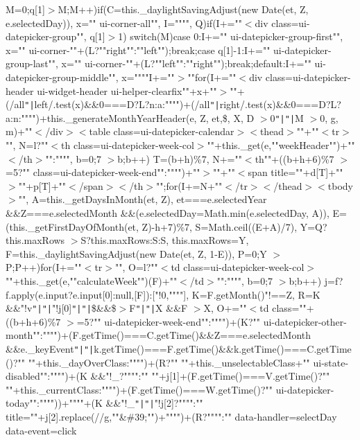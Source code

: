 M=0;q[1]$>$\+M;\+M++)\lcurly{}if(\+C=this.\+\_\+daylight\+Saving\+Adjust(new Date(et, Z, e.\+selected\+Day)), x="" ui-\/corner-\/all"", I="""", Q)\lcurly{}if(\+I+=""$<$div class=\textquotesingle{}ui-\/datepicker-\/group"", q[1]$>$1) switch(\+M)\lcurly{}case 0\+:\+I+="" ui-\/datepicker-\/group-\/first"", x="" ui-\/corner-\/""+(\+L?""right""\+:""left"");break;case q[1]-\/1\+:\+I+="" ui-\/datepicker-\/group-\/last"", x="" ui-\/corner-\/""+(\+L?""left""\+:""right"");break;default\+:\+I+="" ui-\/datepicker-\/group-\/middle"", x=""""\rcurly{}I+=""\textquotesingle{}$>$""\rcurly{}for(\+I+=""$<$div class=\textquotesingle{}ui-\/datepicker-\/header ui-\/widget-\/header ui-\/helper-\/clearfix""+x+""\textquotesingle{}$>$""+(/all\texttt{"|}left/.\+test(x)\&\&0===\+D?\+L?n\+:a\+:"""")+(/all\texttt{"|}right/.\+test(x)\&\&0===\+D?\+L?a\+:n\+:"""")+this.\+\_\+generate\+Month\+Year\+Header(e, Z, et,\$, X, D $>$0\texttt{"|}\texttt{"|}M $>$0, g, m)+""$<$/div$>$$<$table class=\textquotesingle{}ui-\/datepicker-\/calendar\textquotesingle{}$>$$<$thead$>$""+""$<$tr$>$"", N=l?""$<$th class=\textquotesingle{}ui-\/datepicker-\/week-\/col\textquotesingle{}$>$""+this.\+\_\+get(e,""week\+Header"")+""$<$/th$>$""\+:"""", b=0;7 $>$b;b++) T=(b+h)\%7, N+=""$<$th""+((b+h+6)\%7 $>$=5?"" class=\textquotesingle{}ui-\/datepicker-\/week-\/end\textquotesingle{}""\+:"""")+""$>$""+""$<$span title=\textquotesingle{}""+d[T]+""\textquotesingle{}$>$""+p[T]+""$<$/span$>$$<$/th$>$"";for(\+I+=\+N+""$<$/tr$>$$<$/thead$>$$<$tbody$>$"", A=this.\+\_\+get\+Days\+In\+Month(et, Z), et===e.\+selected\+Year \&\&\+Z===e.\+selected\+Month \&\&(e.\+selected\+Day=\+Math.\+min(e.\+selected\+Day, A)), E=(this.\+\_\+get\+First\+Day\+Of\+Month(et, Z)-\/h+7)\%7, S=\+Math.\+ceil((\+E+\+A)/7), Y=\+Q?this.\+max\+Rows $>$\+S?this.\+max\+Rows\+:\+S\+:\+S, this.\+max\+Rows=\+Y, F=this.\+\_\+daylight\+Saving\+Adjust(new Date(et, Z, 1-\/\+E)), P=0;\+Y $>$\+P;\+P++)\lcurly{}for(\+I+=""$<$tr$>$"", O=l?""$<$td class=\textquotesingle{}ui-\/datepicker-\/week-\/col\textquotesingle{}$>$""+this.\+\_\+get(e,""calculate\+Week"")(\+F)+""$<$/td$>$""\+:"""", b=0;7 $>$b;b++) j=f?f.\+apply(e.\+input?e.\+input[0]\+:null,[F])\+:["!0,""""], K=\+F.\+get\+Month()"!==\+Z, R=\+K \&\&"!v\texttt{"|}\texttt{"|}"!j[0]\texttt{"|}\texttt{"|}\$\&\&\$$>$F\texttt{"|}\texttt{"|}X \&\&\+F $>$\+X, O+=""$<$td class=\textquotesingle{}""+((b+h+6)\%7 $>$=5?"" ui-\/datepicker-\/week-\/end""\+:"""")+(\+K?"" ui-\/datepicker-\/other-\/month""\+:"""")+(\+F.\+get\+Time()===\+C.\+get\+Time()\&\&\+Z===e.\+selected\+Month \&\&e.\+\_\+key\+Event\texttt{"|}\texttt{"|}k.\+get\+Time()===\+F.\+get\+Time()\&\&k.\+get\+Time()===\+C.\+get\+Time()?"" ""+this.\+\_\+day\+Over\+Class\+:"""")+(\+R?"" ""+this.\+\_\+unselectable\+Class+"" ui-\/state-\/disabled""\+:"""")+(\+K \&\&"!\+\_\+?""""\+:"" ""+j[1]+(\+F.\+get\+Time()===\+V.\+get\+Time()?"" ""+this.\+\_\+current\+Class\+:"""")+(\+F.\+get\+Time()===\+W.\+get\+Time()?"" ui-\/datepicker-\/today""\+:""""))+""\textquotesingle{}""+(\+K \&\&"!\+\_\+\texttt{"|}\texttt{"|}"!j[2]?""""\+:"" title=\textquotesingle{}""+j[2].\+replace(/\textquotesingle{}/g,""\&\#39;"")+""\textquotesingle{}"")+(\+R?""""\+:"" data-\/handler=\textquotesingle{}select\+Day\textquotesingle{} data-\/event=\textquotesingle{}click\textquotesingle{} 